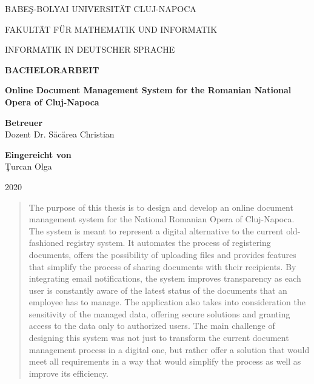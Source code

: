 \documentclass[a4paper,12pt]{report}
\begin{document}
\begin{titlepage}
  \sloppy
  \begin{center}
    BABE\c S-BOLYAI UNIVERSIT\" AT CLUJ-NAPOCA

    FAKULT\" AT F\" UR MATHEMATIK UND INFORMATIK

    INFORMATIK IN DEUTSCHER SPRACHE

    \vspace{6cm}

    \Huge \textbf{BACHELORARBEIT}

    \vspace{0.5cm}

    \Huge \textbf{Online Document Management System for the Romanian National Opera of Cluj-Napoca}

  \end{center}

  \vspace{3cm}

  \begin{flushleft}
    \Large{\textbf{Betreuer}}\\
    Dozent Dr. S\u{a}c\u{a}rea Christian
  \end{flushleft}

  \begin{flushright}
    \Large{\textbf{Eingereicht von}}\\
    \c Turcan Olga
  \end{flushright}

  \vspace{3cm}

  \begin{center}
    2020
  \end{center}
\end{titlepage}



\begin{abstract}
  The purpose of this thesis is to design and develop an online document management system for the National Romanian Opera of Cluj-Napoca. The system is meant to represent a digital alternative to the current old-fashioned registry system. It automates the process of registering documents, offers the possibility of uploading files and provides features that simplify the process of sharing documents with their recipients. By integrating email notifications, the system improves transparency as each user is constantly aware of the latest status of the documents that an employee has to manage. The application also takes into consideration the sensitivity of the managed data, offering secure solutions and granting access to the data only to authorized users.
  The main challenge of designing this system was not just to transform the current document management process in a digital one, but rather offer a solution that would meet all requirements in a way that would simplify the process as well as improve its efficiency.
\end{abstract}
\end{document}
